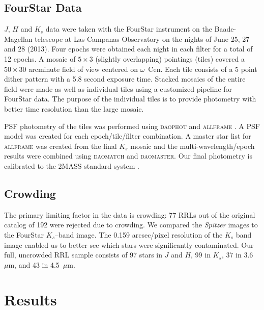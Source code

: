 \documentclass[a4paper,fleqn,usenatbib]{mnras}
\begin{document}
\subsection{FourStar Data}
\label{sec:fourstar_reduction}

$J$, $H$ and $K_s$ data were taken with the FourStar instrument on the Baade-Magellan telescope at Las Campanas Observatory \citep{2013PASP..125..654P} on the nights of June 25, 27 and 28 (2013).  Four epochs were obtained each night in each filter for a total of 12 epochs.  A mosaic of $5\times3$ (slightly overlapping) pointings (tiles) covered a $50\times30$ arcminute field of view centered on $\omega$~Cen.  Each tile consists of a 5 point dither pattern with a 5.8 second exposure time.  Stacked mosaics of the entire field were made as well as individual tiles using a customized pipeline for FourStar data.  The purpose of the individual tiles is to provide photometry with better time resolution than the large mosaic.  

PSF photometry of the tiles was performed using \textsc{daophot} and \textsc{allframe} \citep{1987PASP...99..191S, 1994PASP..106..250S}. A PSF model was created for each epoch/tile/filter combination.  A master star list for \textsc{allframe} was created from the final $K_s$ mosaic and the multi-wavelength/epoch results were combined using \textsc{daomatch} and \textsc{daomaster}.  Our final photometry is calibrated to the 2MASS standard system \citep{2006AJ....131.1163S}. 

\subsection{Crowding}
\label{sec:crowding}

The primary limiting factor in the data is crowding: 77 RRLs out of the original catalog of 192 \citep{2004A&A...424.1101K} were rejected due to crowding. We compared the {\it Spitzer} images to the FourStar $K_s$--band image. The 0.159 arcsec/pixel resolution of the $K_s$ band image enabled us to better see which stars were significantly contaminated. Our full, uncrowded RRL sample consists of 97 stars in $J$ and $H$, 99 in $K_s$, 37 in 3.6~$\mu$m, and 43 in 4.5~$\mu$m.

\section{Results}
\label{sec:results}

\end{document}

